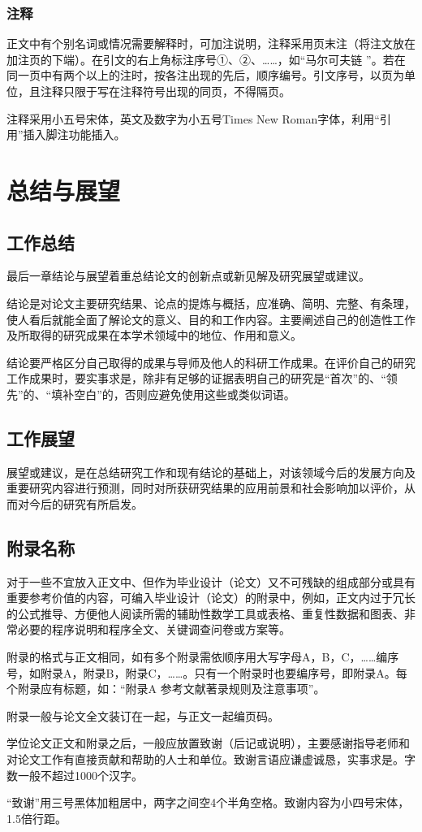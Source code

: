 \documentclass{seuthesis-2022}
\begin{document}
\subsection{注释}
正文中有个别名词或情况需要解释时，可加注说明，注释采用页末注（将注文放在加注页的下端）。在引文的右上角标注序号①、②、……，如“马尔可夫链 ”。若在同一页中有两个以上的注时，按各注出现的先后，顺序编号。引文序号，以页为单位，且注释只限于写在注释符号出现的同页，不得隔页。

注释采用小五号宋体，英文及数字为小五号Times New Roman字体，利用“引用”插入脚注功能插入。

\chapter{总结与展望}
\section{工作总结}
最后一章结论与展望着重总结论文的创新点或新见解及研究展望或建议。

结论是对论文主要研究结果、论点的提炼与概括，应准确、简明、完整、有条理，使人看后就能全面了解论文的意义、目的和工作内容。主要阐述自己的创造性工作及所取得的研究成果在本学术领域中的地位、作用和意义。

结论要严格区分自己取得的成果与导师及他人的科研工作成果。在评价自己的研究工作成果时，要实事求是，除非有足够的证据表明自己的研究是“首次”的、“领先”的、“填补空白”的，否则应避免使用这些或类似词语。

\section{工作展望}
展望或建议，是在总结研究工作和现有结论的基础上，对该领域今后的发展方向及重要研究内容进行预测，同时对所获研究结果的应用前景和社会影响加以评价，从而对今后的研究有所启发。




\appendix
\section{附录名称}
对于一些不宜放入正文中、但作为毕业设计（论文）又不可残缺的组成部分或具有重要参考价值的内容，可编入毕业设计（论文）的附录中，例如，正文内过于冗长的公式推导、方便他人阅读所需的辅助性数学工具或表格、重复性数据和图表、非常必要的程序说明和程序全文、关键调查问卷或方案等。

附录的格式与正文相同，如有多个附录需依顺序用大写字母A，B，C，……编序号，如附录A，附录B，附录C，……。只有一个附录时也要编序号，即附录A。每个附录应有标题，如：“附录A 参考文献著录规则及注意事项”。

附录一般与论文全文装订在一起，与正文一起编页码。


\acknowledgement
学位论文正文和附录之后，一般应放置致谢（后记或说明），主要感谢指导老师和对论文工作有直接贡献和帮助的人士和单位。致谢言语应谦虚诚恳，实事求是。字数一般不超过1000个汉字。

“致谢”用三号黑体加粗居中，两字之间空4个半角空格。致谢内容为小四号宋体，1.5倍行距。
\end{document}
